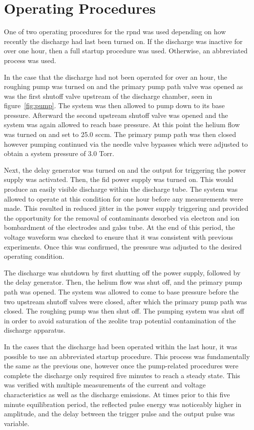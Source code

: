 \section{Operating Procedures}

One of two operating procedures for the \acs{rpnd} was used depending on how
recently the discharge had last been turned on. If the discharge was inactive
for over one hour, then a full startup procedure was used. Otherwise, an
abbreviated process was used.

In the case that the discharge had not been operated for over an hour, the
roughing pump was turned on and the primary pump path valve was opened as was
the first shutoff valve upstream of the discharge chamber, seen in
figure~\ref{fig:pump}. The system was then allowed to pump down to its base
pressure. Afterward the second upstream shutoff valve was opened and the system
was again allowed to reach base pressure. At this point the helium flow was
turned on and set to 25.0 sccm. The primary pump path was then closed however
pumping continued via the needle valve bypasses which were adjusted to obtain a
system pressure of 3.0 Torr.

Next, the delay generator was turned on and the output for triggering the power
supply was activated. Then, the \acs{fid} power supply was turned on. This would
produce an easily visible discharge within the discharge tube. The system was
allowed to operate at this condition for one hour before any measurements were
made. This resulted in reduced jitter in the power supply triggering and
provided the opportunity for the removal of contaminants desorbed via electron
and ion bombardment of the electrodes and galss tube. At the end of this period,
the voltage waveform was checked to ensure that it was consistent with previous
experiments. Once this was confirmed, the pressure was adjusted to the desired
operating condition.

The discharge was shutdown by first shutting off the power supply, followed by
the delay generator. Then, the helium flow was shut off, and the primary pump
path was opened. The system was allowed to come to base pressure before the two
upstream shutoff valves were closed, after which the primary pump path was
closed. The roughing pump was then shut off. The pumping system was shut off in
order to avoid saturation of the zeolite trap potential contamination of the
discharge apparatus.

In the cases that the discharge had been operated within the last hour, it was
possible to use an abbreviated startup procedure. This process was fundamentally
the same as the previous one, however once the pump-related procedures were
complete the discharge only required five minutes to reach a steady state. This
was verified with multiple measurements of the current and voltage
characteristics as well as the discharge emissions. At times prior to this five
minute equilibration period, the reflected pulse energy was noticeably higher in
amplitude, and the delay between the trigger pulse and the output pulse was
variable.

